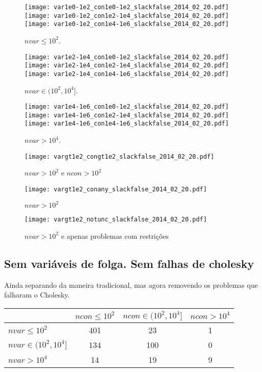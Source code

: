 \documentclass{article}
\begin{document}
\begin{figure}[H]
\centering
\texttt{[image: var1e0-1e2\_con1e0-1e2\_slackfalse\_2014\_02\_20.pdf]}
\texttt{[image: var1e0-1e2\_con1e2-1e4\_slackfalse\_2014\_02\_20.pdf]}
\texttt{[image: var1e0-1e2\_con1e4-1e6\_slackfalse\_2014\_02\_20.pdf]}
\caption{ $nvar \leq 10^2$. }
\label{fig:nvar_small}
\end{figure}
\begin{figure}[H]
\centering
\texttt{[image: var1e2-1e4\_con1e0-1e2\_slackfalse\_2014\_02\_20.pdf]}
\texttt{[image: var1e2-1e4\_con1e2-1e4\_slackfalse\_2014\_02\_20.pdf]}
\texttt{[image: var1e2-1e4\_con1e4-1e6\_slackfalse\_2014\_02\_20.pdf]}
\caption{ $nvar \in (10^2,10^4]$. }
\label{fig:nvar_medium}
\end{figure}
\begin{figure}[H]
\centering
\texttt{[image: var1e4-1e6\_con1e0-1e2\_slackfalse\_2014\_02\_20.pdf]}
\texttt{[image: var1e4-1e6\_con1e2-1e4\_slackfalse\_2014\_02\_20.pdf]}
\texttt{[image: var1e4-1e6\_con1e4-1e6\_slackfalse\_2014\_02\_20.pdf]}
\caption{ $nvar > 10^4$. }
\label{fig:nvar_big}
\end{figure}

\begin{figure}[H]
\centering
\texttt{[image: vargt1e2\_congt1e2\_slackfalse\_2014\_02\_20.pdf]}
\caption{ $nvar > 10^2$ e $ncon > 10^2$ }
\label{fig:both_medium_and_big}
\end{figure}

\begin{figure}[H]
\centering
\texttt{[image: vargt1e2\_conany\_slackfalse\_2014\_02\_20.pdf]}
\caption{ $nvar > 10^2$ }
\label{fig:nvar_medium_and_big}
\end{figure}

\begin{figure}[H]
\centering
\texttt{[image: vargt1e2\_notunc\_slackfalse\_2014\_02\_20.pdf]}
\caption{ $nvar > 10^2$ e apenas problemas com restrições }
\label{fig:nvar_medium_and_big_not_unc}
\end{figure}

\newpage
\subsection{Sem variáveis de folga. Sem falhas de cholesky}

Ainda separando da maneira tradicional, mas agora removendo os problemas que
falharam o Cholesky.
\begin{center}
\begin{tabular}{|l|c|c|c|} \hline
& $ncon \leq 10^2$ & $ncon \in (10^2,10^4]$ & $ncon > 10^4$ \\ \hline
$nvar \leq 10^2$       & 401 &  23 &  1 \\ \hline
$nvar \in (10^2,10^4]$ & 134 & 100 &  0 \\ \hline
$nvar > 10^4$          &  14 &  19 &  9 \\ \hline
\end{tabular}
\end{center}
\end{document}
